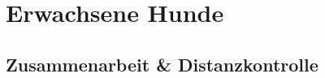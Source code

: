 \chapter{Erwachsene Hunde}
\label{chap:gruppe:erwachsen}

\section{Zusammenarbeit \& Distanzkontrolle}

